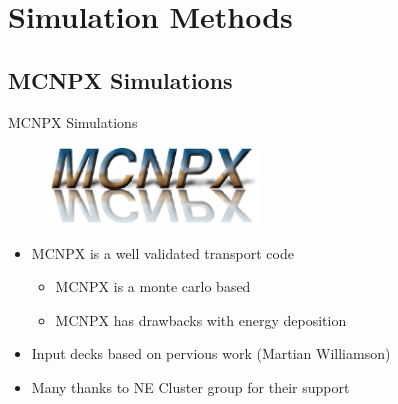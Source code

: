 
% 
%
\section{Simulation Methods}

\subsection{MCNPX Simulations}
\begin{frame}{MCNPX Simulations}
	\centering
	\begin{figure}
		\includegraphics[width=0.5\textwidth]{images/logo-mcnpx.eps}
	\end{figure}
\begin{itemize}
    \item MCNPX is a well validated transport code \cite{pelowitz_mcnpx_2010}
    \begin{itemize}
        \item MCNPX is a monte carlo based
        \item MCNPX has drawbacks with energy deposition
    \end{itemize}
    \item Input decks based on pervious work (Martian Williamson)
    \item Many thanks to NE Cluster group for their support
\end{itemize}
\end{frame}
